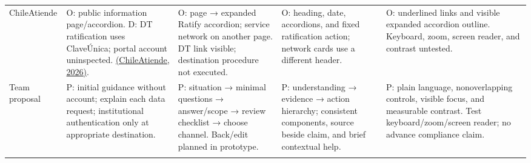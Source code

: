 \begin{landscape}
\begin{singlespace}
\begin{xltabular}{\linewidth}{@{}p{1.02in}YYYY@{}}
ChileAtiende & O: public information page/accordion. D: DT ratification uses ClaveÚnica; portal account uninspected. \hyperref[ref:ca_finiquito]{(ChileAtiende, 2026)}. & O: page → expanded Ratify accordion; service network on another page. DT link visible; destination procedure not executed. & O: heading, date, accordions, and fixed ratification action; network cards use a different header. & O: underlined links and visible expanded accordion outline. Keyboard, zoom, screen reader, and contrast untested.\\\addlinespace[3pt]

Team proposal & P: initial guidance without account; explain each data request; institutional authentication only at appropriate destination. & P: situation → minimal questions → answer/scope → review checklist → choose channel. Back/edit planned in prototype. & P: understanding → evidence → action hierarchy; consistent components, source beside claim, and brief contextual help. & P: plain language, nonoverlapping controls, visible focus, and measurable contrast. Test keyboard/zoom/screen reader; no advance compliance claim.\\\addlinespace[3pt]

\end{xltabular}\end{singlespace}\end{landscape}

